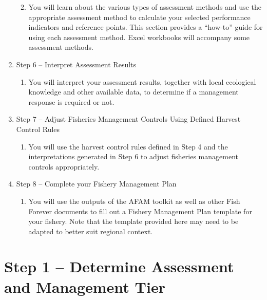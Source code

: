 \documentclass[]{book}
\providecommand{\tightlist}{%
  \setlength{\itemsep}{0pt}\setlength{\parskip}{0pt}}
\begin{document}
\begin{enumerate}
  \begin{enumerate}
  \def\labelenumii{\alph{enumii}.}
  \tightlist
  \item
    You will learn about the various types of assessment methods and use
    the appropriate assessment method to calculate your selected
    performance indicators and reference points. This section provides a
    ``how-to'' guide for using each assessment method. Excel workbooks
    will accompany some assessment methods.
  \end{enumerate}
\item
  Step 6 -- Interpret Assessment Results

  \begin{enumerate}
  \def\labelenumii{\alph{enumii}.}
  \tightlist
  \item
    You will interpret your assessment results, together with local
    ecological knowledge and other available data, to determine if a
    management response is required or not.
  \end{enumerate}
\item
  Step 7 -- Adjust Fisheries Management Controls Using Defined Harvest
  Control Rules

  \begin{enumerate}
  \def\labelenumii{\alph{enumii}.}
  \tightlist
  \item
    You will use the harvest control rules defined in Step 4 and the
    interpretations generated in Step 6 to adjust fisheries management
    controls appropriately.
  \end{enumerate}
\item
  Step 8 -- Complete your Fishery Management Plan

  \begin{enumerate}
  \def\labelenumii{\alph{enumii}.}
  \tightlist
  \item
    You will use the outputs of the AFAM toolkit as well as other Fish
    Forever documents to fill out a Fishery Management Plan template for
    your fishery. Note that the template provided here may need to be
    adapted to better suit regional context.
  \end{enumerate}
\end{enumerate}

\chapter{Step 1 -- Determine Assessment and Management
Tier}\label{Step1}
\end{document}
